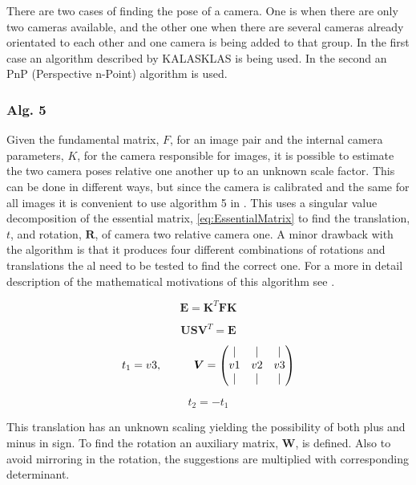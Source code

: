 There are two cases of finding the pose of a camera. One is when there are only two cameras available, and the other one when there are several cameras already orientated to each other and one camera is being added to that group. In the first case an algorithm described by KALASKLAS is being used. In the second an PnP (Perspective n-Point) algorithm is used.

\subsubsection{Alg. 5}
Given the fundamental matrix, $F$, for an image pair and the internal camera parameters, $K$, for the camera responsible for images, it is possible to estimate the two camera poses relative one another up to an unknown scale factor. This can be done in different ways, but since the camera is calibrated and the same for all images it is convenient to use algorithm 5 in \cite{Klas}. This uses a singular value decomposition of the essential matrix, \eqref{eq:EssentialMatrix} to find the translation, $t$, and rotation, $\boldsymbol{R}$, of camera two relative camera one. A minor drawback with the algorithm is that it produces four different combinations of rotations and translations the al need to be tested to find the correct one. For a more in detail description of the mathematical motivations of this algorithm see \cite{Klas}. 

\begin{equation}
\label{eq:EssentialMatrix}
\boldsymbol{E} = \boldsymbol{K}^T \boldsymbol{FK}
\end{equation}

\begin{equation}
\boldsymbol{U S V}^T = \boldsymbol{E}
\end{equation}

\begin{equation}
t_1 = v3, \hspace{1 cm}  \boldsymbol{V} = \begin{pmatrix}
										 |  & |  & |  \\
										 v1 & v2 & v3 \\
										 |  & |  & |
										\end{pmatrix}
\end{equation}

\begin{equation}
t_2 = -t_1
\end{equation}

This translation has an unknown scaling yielding the possibility of both plus and minus in sign. To find the rotation an auxiliary matrix, $\boldsymbol{W}$, is defined. Also to avoid mirroring in the rotation, the suggestions are multiplied with corresponding determinant.

